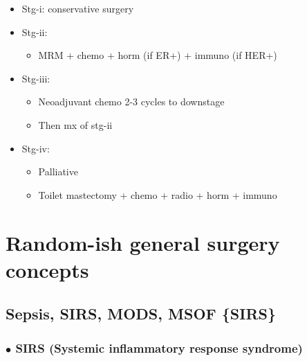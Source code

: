 \documentclass[
  14pt,
]{memoir}
\providecommand{\tightlist}{%
  \setlength{\itemsep}{0pt}\setlength{\parskip}{0pt}}
\begin{document}
\begin{itemize}
\tightlist
\item
  Stg-i: conservative surgery
\item
  Stg-ii:

  \begin{itemize}
  \tightlist
  \item
    MRM + chemo + horm (if ER+) + immuno (if HER+)
  \end{itemize}
\item
  Stg-iii:

  \begin{itemize}
  \tightlist
  \item
    Neoadjuvant chemo 2-3 cycles to downstage
  \item
    Then mx of stg-ii
  \end{itemize}
\item
  Stg-iv:

  \begin{itemize}
  \tightlist
  \item
    Palliative
  \item
    Toilet mastectomy + chemo + radio + horm + immuno
  \end{itemize}
\end{itemize}

\pagebreak

\hypertarget{random-ish-general-surgery-concepts}{%
\chapter{Random-ish general surgery
concepts}\label{random-ish-general-surgery-concepts}}

\hypertarget{sepsis-sirs-mods-msof-sirs}{%
\section{Sepsis, SIRS, MODS, MSOF
\{SIRS\}}\label{sepsis-sirs-mods-msof-sirs}}

\hypertarget{bullet-sirs-systemic-inflammatory-response-syndrome}{%
\subsection{\texorpdfstring{\(\bullet\) SIRS (Systemic inflammatory
response
syndrome)}{\textbackslash bullet SIRS (Systemic inflammatory response syndrome)}}\label{bullet-sirs-systemic-inflammatory-response-syndrome}}
\end{document}
